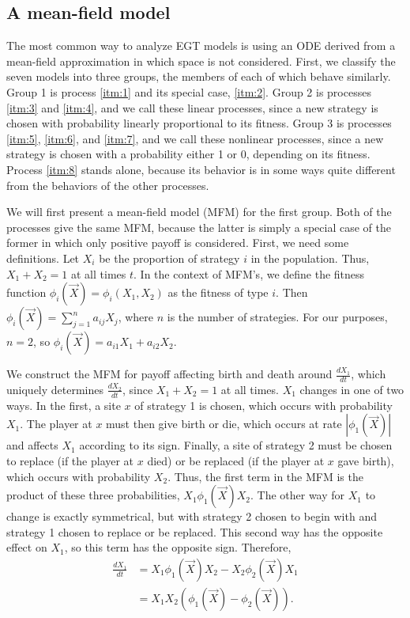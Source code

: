 \documentclass[notitlepage,reqno]{amsart}
\begin{document}
\subsection{A mean-field model}
\label{sec:mfm}
The most common way to analyze EGT models is using an ODE derived from
a mean-field approximation in which space is not considered. First, we
classify the seven models into three groups, the members of each of
which behave similarly. Group 1 is process \ref{itm:1} and its special
case, \ref{itm:2}. Group 2 is processes \ref{itm:3} and \ref{itm:4},
and we call these linear processes, since a new strategy is chosen
with probability linearly proportional to its fitness. Group 3 is
processes \ref{itm:5}, \ref{itm:6}, and \ref{itm:7}, and
we call these nonlinear processes, since a new strategy is chosen with
a probability either 1 or 0, depending on its fitness. Process
\ref{itm:8} stands alone, because its behavior is in some ways quite
different from the behaviors of the other processes.

We will first present a mean-field model (MFM) for the first group. Both of the processes give the
same MFM, because the latter is simply a special case of the former in
which only positive payoff is considered. First, we need
some definitions. Let $X_i$ be the proportion of strategy $i$ in the population. Thus, $X_1+X_2 = 1$ at all times $t$. In the context of
MFM's, we define the fitness function $\phi_i(\vec{X}) = \phi_i(X_1,X_2)$
as the fitness of type $i$. Then $\phi_i(\vec{X}) =
\sum_{j=1}^n a_{ij}X_j$, where $n$ is the number of
strategies. For our purposes, $n=2$, so $\phi_i(\vec{X}) = a_{i1}X_1 +
a_{i2}X_2$.

We construct the MFM for payoff affecting birth and
death around $\frac{d X_1}{dt}$, which uniquely determines $\frac{d
  X_2}{dt}$, since $X_1+X_2=1$ at all times. $X_1$ changes in one of
two ways. In the first, a site $x$ of strategy 1 is chosen, which
occurs with probability $X_1$. The player at $x$ must then give birth or die, which occurs at rate
$|\phi_1(\vec{X})|$ and affects $X_1$ according to its sign.
Finally, a site of strategy 2 must be chosen to replace (if the player at
$x$ died) or be replaced (if the player at $x$ gave birth), which
occurs with probability $X_2$. Thus, the first term in the MFM is the
product of these three probabilities, $X_1\phi_1(\vec{X})X_2$. The other way for $X_1$ to change is exactly symmetrical, but with
strategy 2 chosen to begin with and strategy 1 chosen to replace or be
replaced. This second way has the opposite effect on $X_1$, so this
term has the opposite sign. Therefore,
\begin{align*}
    \frac{dX_1}{dt} &= X_1\phi_1(\vec{X})X_2 - X_2\phi_2(\vec{X})X_1
    \\
    &= X_1X_2\left(\phi_1(\vec{X})-\phi_2(\vec{X})\right).
\end{align*}
\end{document}
